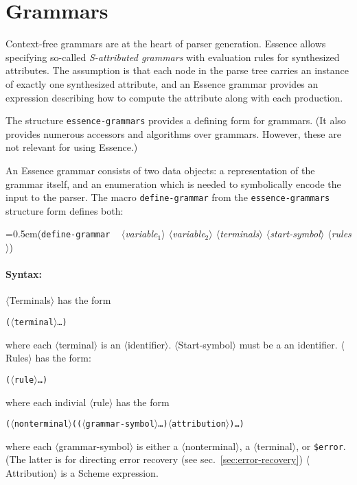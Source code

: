 \documentclass{article}
\newcommand{\meta}[1]{\textrm{$\langle$#1$\rangle$}}
\newcommand{\pproto}[2]{\noindent%
{\texonly\spaceskip=0.5em\endtexonly{}#1}%
~\nobreak\textrm{#2}}
\newcommand{\proto}[3]{\par\bigskip\begin{flushleft}\pproto{(\texttt{#1}}{\textit{#2})}\hspace*{\fill}{#3}\end{flushleft}}
\newcommand{\dotsfoo}{\ldots\thinspace}
\newcommand{\codefont}[1]{\texttt{#1}}
\begin{document}
\section{Grammars}
\label{sec:grammars}

Context-free grammars are at the heart of parser generation.  Essence
allows specifying so-called \emph{S-attributed grammars} with
evaluation rules for synthesized attributes.  The assumption is that
each node in the parse tree carries an instance of exactly one
synthesized attribute, and an Essence grammar provides an expression describing 
how to compute the attribute along with each production.

The structure \codefont{essence-grammars} provides a defining form for
grammars.  (It also provides numerous accessors and algorithms over
grammars.  However, these are not relevant for using Essence.)

An Essence grammar consists of two data objects: a representation of
the grammar itself, and an enumeration which is needed to symbolically encode the
input to the parser.  The macro \codefont{define-grammar} from the
\codefont{essence-grammars} structure form defines both:

\label{form:define-grammar}
\proto{define-grammar}{ \meta{variable$_1$} \meta{variable$_2$}\hfill\linebreak\hspace*{1em}
    \meta{terminals}
  \meta{start-symbol} \meta{rules}}{syntax}

\paragraph{Syntax:} \meta{Terminals} has the form
%
\begin{alltt}
  (\meta{terminal} \dotsfoo)
\end{alltt}
%
where each \meta{terminal} is an \meta{identifier}.  
\meta{Start-symbol} must
be a an identifier.  \meta{Rules} has the form:
%
\begin{alltt}
  (\meta{rule} \dotsfoo)
\end{alltt}
%
where each indivial \meta{rule} has the form
%
\begin{alltt}
  (\meta{nonterminal} ((\meta{grammar-symbol} \dotsfoo) \meta{attribution}) \dotsfoo)
\end{alltt}
%
where each \meta{grammar-symbol} is either a \meta{nonterminal}, a
\meta{terminal}, or \codefont{\$error}.  (The latter is for directing
error recovery (see
sec.~\ref{sec:error-recovery}) \meta{Attribution}
is a Scheme expression.
\end{document}

